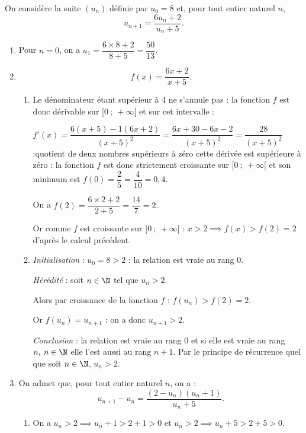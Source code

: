 \medskip

On considère la suite $\left(u_n\right)$ définie par $u_0 = 8$ et, pour tout entier naturel $n$,
\[u_{n +1} = \dfrac{6u_n + 2}{u_n +5}.\]

\smallskip

\begin{enumerate}
\item 
Pour $n = 0$, on a $u_1 = \dfrac{6 \times 8 + 2}{8 + 5} = \dfrac{50}{13}$.
\item 
\[f(x) = \dfrac{6x + 2 }{x +5}.\]


	\begin{enumerate}
		\item 
		Le dénominateur étant supérieur à 4 ne s'annule pas : la fonction $f$ est donc dérivable sur $[0~;~+\infty[$ et sur cet intervalle :
		
$f'(x) = \dfrac{6(x + 5) - 1(6x + 2)}{(x + 5)^2} = \dfrac{6x + 30 - 6x - 2}{(x + 5)^2} = \dfrac{28}{(x + 5)^2}$ :quotient de deux nombres supérieurs à zéro cette dérivée est supérieure à zéro : la fonction $f$ est donc strictement croissante sur $[0~;~+\infty[$ et son minimum est $f(0) = \dfrac25 = \dfrac{4}{10} = 0,4$.
		

On a $f(2) = \dfrac{6\times 2 + 2}{2 + 5} = \dfrac{14}{7} = 2$.

Or comme $f$ est croissante sur $[0~;~+\infty[$ :
$x > 2 \implies f(x) > f(2) = 2$ d'après le calcul précédent.

		\item 
\emph{Initialisation} : $u_0 = 8 > 2$ : la relation est vraie au rang $0$.
	
\emph{Hérédité} : soit $n \in \N$ tel que $u_n > 2$.

Alors par croissance de la fonction $f$ : $f\left(u_n\right) > f(2) = 2$.

Or $f\left(u_n\right) = u_{n+1}$ : on a donc $u_{n+1} > 2$.

\emph{Conclusion} : la relation est vraie au rang $0$ et si elle est vraie au rang $n, \: n \in \N$ elle l'est aussi au rang $n + 1$. Par le principe de récurrence quel que soit $n \in \N$, \: $u_n > 2$.
	\end{enumerate}
\item On admet que, pour tout entier naturel $n$, on a :
\[u_{n+1} - u_n = \dfrac{\left(2 - u_n\right)\left(u_n + 1\right)}{u_n +5}.\]

	\begin{enumerate}
		\item 
		On a $u_n > 2 \implies u_n + 1 > 2 + 1 > 0$ et $u_n > 2 \implies u_n + 5 > 2 + 5 > 0$.
		

\end{enumerate}
\end{enumerate}
